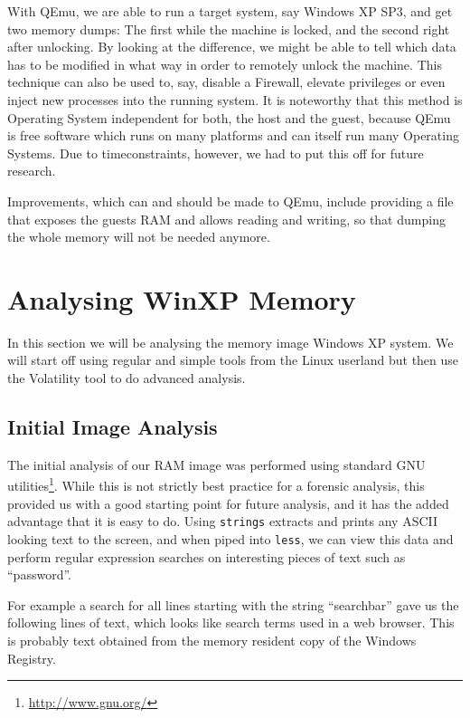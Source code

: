 \documentclass[a4paper,
    11pt,
    normalheadings,
    parindent,
    UKenglish,
    abstracton,
    ]{scrartcl}
\begin{document}
With QEmu, we are able to run a target system, say Windows XP SP3, and get two memory dumps:
The first while the machine is locked, and the second right after unlocking.
By looking at the difference, we might be able to tell which data has to be modified in what way in order to remotely unlock the machine.
This technique can also be used to, say, disable a Firewall, elevate privileges or even inject new processes into the running system.
It is noteworthy that this method is Operating System independent for both, the host and the guest, because QEmu is free software which runs on many platforms and can itself run many Operating Systems.
Due to timeconstraints, however, we had to put this off for future research.

Improvements, which can and should be made to QEmu, include providing a file that exposes the guests RAM and allows reading and writing, so that dumping the whole memory will not be needed anymore.







\section{Analysing WinXP Memory}
In this section we will be analysing the memory image Windows XP system.
We will start off using regular and simple tools from the Linux userland but then use the Volatility tool to do advanced analysis.


\subsection{Initial Image Analysis}
The initial analysis of our RAM image was performed using standard GNU utilities\footnote{\url{http://www.gnu.org/}}.
While this is not strictly best practice for a forensic analysis, this provided us with a good starting point for future analysis, and it has the added advantage that it is easy to do.
Using \texttt{strings} extracts and prints any ASCII looking text to the screen, and when piped into \texttt{less}, we can view this data and perform regular expression searches on interesting pieces of text such as ``password''.

For example a search for all lines starting with the string ``searchbar'' gave us the following lines of text, which looks like search terms used in a web browser.
This is probably text obtained from the memory resident copy of the Windows Registry.
\end{document}

